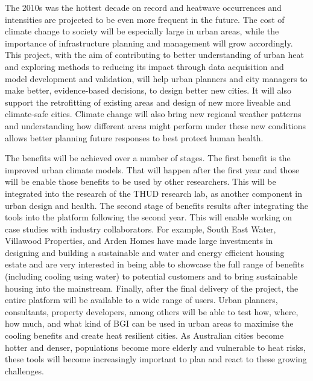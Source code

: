 The 2010s was the hottest decade on record and heatwave occurrences and intensities are projected to be even more frequent in the future. The cost of climate change to society will be especially large in urban areas, while the importance of infrastructure planning and management will grow accordingly. This project, with the aim of contributing to better understanding of urban heat and exploring methods to reducing its impact through data acquisition and model development and validation, will help urban planners and city managers to make better, evidence-based decisions, to design better new cities. It will also support the retrofitting of existing areas and design of new more liveable and climate-safe cities. Climate change will also bring new regional weather patterns and understanding how different areas might perform under these new conditions allows better planning future responses to best protect human health.





The benefits will be achieved over a number of stages. The first benefit is the improved urban climate models. That will happen after the first year and those will be enable those benefits to be used by other researchers. This will be integrated into the research of the THUD research lab, as another component in urban design and health. The second stage of benefits results after integrating the tools into the platform following the second year. This will enable working on case studies with industry collaborators. For example, South East Water, Villawood Properties, and Arden Homes have made large investments in designing and building a sustainable and water and energy efficient housing estate and are very interested in being able to showcase the full range of benefits (including cooling using water) to potential customers and to bring sustainable housing into the mainstream. Finally, after the final delivery of the project, the entire platform will be available to a wide range of users. Urban planners, consultants, property developers, among others will be able to test how, where, how much, and what kind of BGI can be used in urban areas to maximise the cooling benefits and create heat resilient cities. As Australian cities become hotter and denser, populations become more elderly and vulnerable to heat risks, these tools will become increasingly important to plan and react to these growing challenges.

